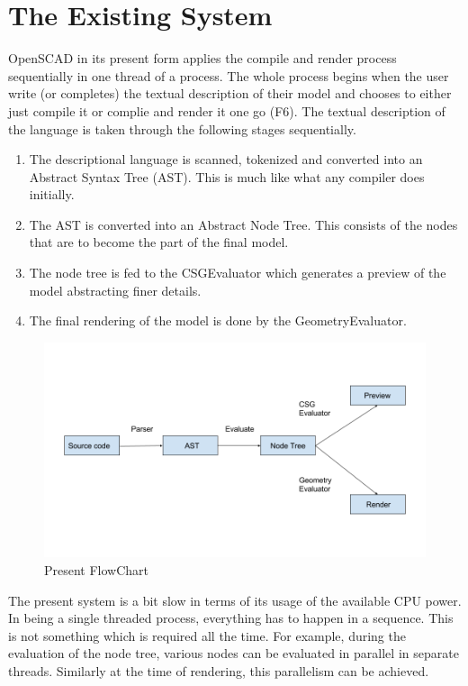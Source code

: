 \section{The Existing System}
OpenSCAD in its present form applies the compile and render process sequentially in one thread of a process. The whole process begins when the user write (or completes) the textual description of their model and chooses to either just compile it or complie and render it one go (F6). The textual description of the language is taken through the following stages sequentially.
\begin{enumerate}
	\item The descriptional language is scanned, tokenized and converted into an Abstract Syntax Tree (AST). This is much like what any compiler does initially.
	\item The AST is converted into an Abstract Node Tree. This consists of the nodes that are to become the part of the final model.
	\item The node tree is fed to the CSGEvaluator which generates a preview of the model abstracting finer details.
	\item The final rendering of the model is done by the GeometryEvaluator.
\end{enumerate}

\begin{figure}[H]
\centering
\includegraphics[width=\linewidth]{images/flowchart}
\caption{Present FlowChart}
\label{fig:flowchart}
\end{figure}

The present system is a bit slow in terms of its usage of the available CPU power. In being a single threaded process, everything has to happen in a sequence. This is not something which is required all the time. For example, during the evaluation of the node tree, various nodes can be evaluated in parallel in separate threads. Similarly at the time of rendering, this parallelism can be achieved.

